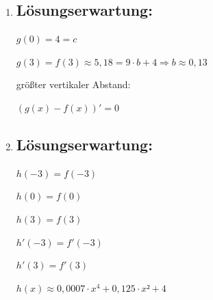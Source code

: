 \begin{langesbeispiel}
{\begin{enumerate}
	$\delta=f(3)-f(0)$
	
	$\delta=1,2$\,m\leer
	
	Die Seillänge beträgt ca. 6,6\,m.
	
	$\delta_1(8,6)\approx 2,8 \Rightarrow$ Der Durchhang nimmt um ca. 1,6\,m zu.

\item \subsection{Lösungserwartung:}
	
$g(0)=4=c$\leer

$g(3)=f(3)\approx 5,18=9\cdot b+4 \Rightarrow b\approx 0,13$\leer

größter vertikaler Abstand:

$(g(x)-f(x))'=0$

\item \subsection{Lösungserwartung:}
	
$h(-3)=f(-3)$

$h(0)=f(0)$

$h(3)=f(3)$

$h'(-3)=f'(-3)$

$h'(3)=f'(3)$\leer

$h(x)\approx 0,0007\cdot x^4+0,125\cdot x²+4$

\end{enumerate}}
		\end{langesbeispiel}